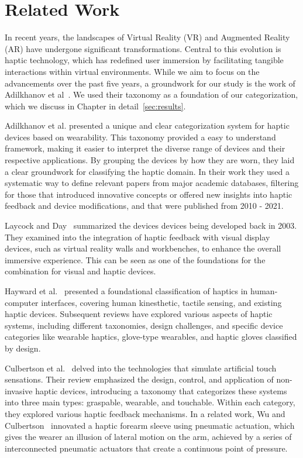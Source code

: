 \section{Related Work}
\label{sec:rel_work}

In recent years, the landscapes of Virtual Reality (VR) and Augmented Reality (AR) have undergone significant transformations. Central to this evolution is haptic technology, which has redefined user immersion by facilitating tangible interactions within virtual environments. While we aim to focus on the advancements over the past five years, a groundwork for our study is the work of Adilkhanov et al~\cite{Adilkhanov22}. We used their taxonomy as a foundation of our categorization, which we discuss in Chapter in detail~\ref{sec:results}.

Adilkhanov et al. presented a unique and clear categorization system for haptic devices based on wearability. This taxonomy provided a easy to understand framework, making it easier to interpret the diverse range of devices and their respective applications. By grouping the devices by how they are worn, they laid a clear groundwork for classifying the haptic domain. In their work they used a systematic way to define relevant papers from major academic databases, filtering for those that introduced innovative concepts or offered new insights into haptic feedback and device modifications, and that were published from 2010 - 2021. 

Laycock and Day~\cite{Layvock03} summarized the devices devices being developed back in 2003. They examined into the integration of haptic feedback with visual display devices, such as virtual reality walls and workbenches, to enhance the overall immersive experience. This can be seen as one of the foundations for the combination for visual and haptic devices.

Hayward et al.~\cite{Hayward04c} presented a foundational classification of haptics in human-computer interfaces, covering human kinesthetic, tactile sensing, and existing haptic devices. Subsequent reviews have explored various aspects of haptic systems, including different taxonomies, design challenges, and specific device categories like wearable haptics, glove-type wearables, and haptic gloves classified by design.

Culbertson et al.~\cite{Culbertson18} delved into the technologies that simulate artificial touch sensations. Their review emphasized the design, control, and application of non-invasive haptic devices, introducing a taxonomy that categorizes these systems into three main types: graspable, wearable, and touchable. Within each category, they explored various haptic feedback mechanisms. In a related work, Wu and Culbertson~\cite{WuC19} innovated a haptic forearm sleeve using pneumatic actuation, which gives the wearer an illusion of lateral motion on the arm, achieved by a series of interconnected pneumatic actuators that create a continuous point of pressure.

